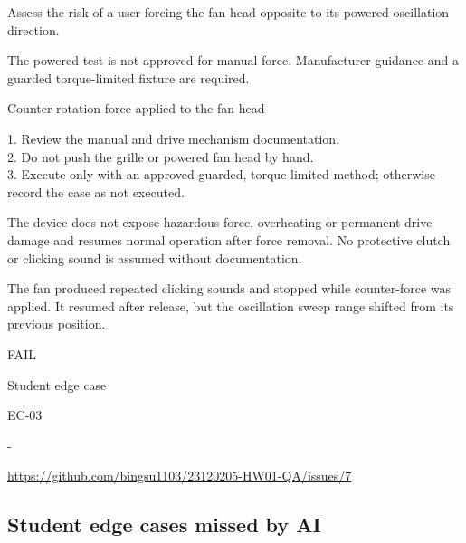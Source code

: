 \begin{description}[style=nextline,leftmargin=3.2cm]

\item[Objective] Assess the risk of a user forcing the fan head opposite to its powered oscillation direction.

\item[Preconditions] The powered test is not approved for manual force. Manufacturer guidance and a guarded torque-limited fixture are required.

\item[Input] Counter-rotation force applied to the fan head

\item[Steps] 1. Review the manual and drive mechanism documentation.\\ 2. Do not push the grille or powered fan head by hand.\\ 3. Execute only with an approved guarded, torque-limited method; otherwise record the case as not executed.

\item[Expected] The device does not expose hazardous force, overheating or permanent drive damage and resumes normal operation after force removal. No protective clutch or clicking sound is assumed without documentation.

\item[Actual] The fan produced repeated clicking sounds and stopped while counter-force was applied. It resumed after release, but the oscillation sweep range shifted from its previous position.

\item[Verdict] FAIL

\item[Source] Student edge case

\item[Edge case] EC-03

\item[Video] -

\item[Issue] \url{https://github.com/bingsu1103/23120205-HW01-QA/issues/7}

\end{description}

\subsection{Student edge cases missed by AI}

